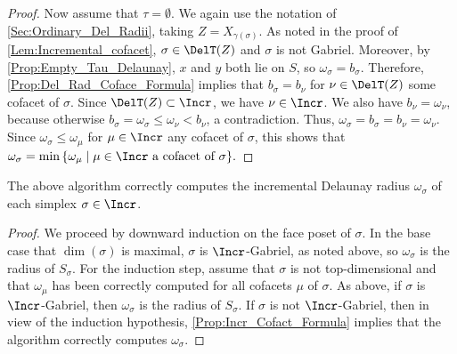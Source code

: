 \begin{proof}
%
Now assume that $\tau=\emptyset$.  We again use the notation of \cref{Sec:Ordinary_Del_Radii}, taking $Z=X_{\gamma(\sigma)}$.  
As noted in the proof of \cref{Lem:Incremental_cofacet}, $\sigma\in \DelT(Z)$ and $\sigma$ is not Gabriel.
Moreover, by \cref{Prop:Empty_Tau_Delaunay}, $x$ and $y$ both lie on $S$, so $\omega_{\sigma}=b_{\sigma}$.   Therefore, \cref{Prop:Del_Rad_Coface_Formula} implies that $b_{\sigma}=b_{\nu}$ for $\nu\in \DelT(Z)$ some cofacet of $\sigma$.  Since  $\DelT(Z)\subset \Incr$, we have $\nu\in \Incr$.  We also have $b_\nu=\omega_\nu$, because otherwise $b_\sigma=\omega_\sigma \leq \omega_\nu < b_\nu$, a contradiction.  Thus, $\omega_\sigma=b_\sigma=b_\nu=\omega_\nu$.  Since $\omega_{\sigma}\leq \omega_\mu$ for  $\mu\in \Incr$ any cofacet of $\sigma$, this shows that $\omega_{\sigma}= \min\, \{\omega_{\mu} \mid \mu\in \Incr \textup{ a cofacet of } \sigma\}.$
\end{proof}
%
\begin{proposition} 
    The above algorithm correctly computes the incremental Delaunay radius $\omega_\sigma$ of each simplex $\sigma \in \Incr$.
\end{proposition}
%
\begin{proof}
We proceed by downward induction on the face poset of $\sigma$.  In the base case that $\dim(\sigma)$ is maximal, $\sigma$ is $\Incr$-Gabriel, as noted above, so  $\omega_{\sigma}$ is the radius of $ S_{\sigma}$.  
For the induction step, assume that $\sigma$ is not top-dimensional and that $\omega_{\mu}$ has been correctly computed for all cofacets $\mu$ of $\sigma$.  As above, if $\sigma$ is $\Incr$-Gabriel, then $\omega_{\sigma}$ is the radius of $S_\sigma$.  If $\sigma$ is not $\Incr$-Gabriel, then in view of the induction hypothesis, \cref{Prop:Incr_Cofact_Formula} implies that the algorithm correctly computes $\omega_{\sigma}$. 
\end{proof}
%
%
\newpage
